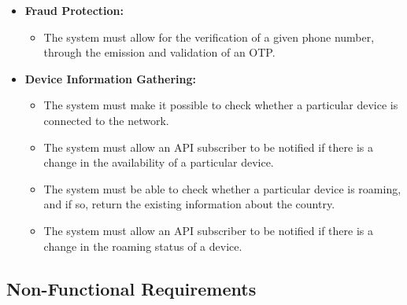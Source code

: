 \begin{itemize}
	\item \textbf{Fraud Protection:}
	      \begin{itemize}
		      \item The system must allow for the verification of a given phone number,
		            through the emission and validation of an OTP.
	      \end{itemize}

	\item \textbf{Device Information Gathering:}
	      \begin{itemize}
		      \item The system must make it possible to check whether a particular
		            device is connected to the network.

		      \item The system must allow an API subscriber to be notified if there is
		            a change in the availability of a particular device.

		      \item The system must be able to check whether a particular device is
		            roaming, and if so, return the existing information about the country.

		      \item The system must allow an API subscriber to be notified if there is
		            a change in the roaming status of a device.
	      \end{itemize}
\end{itemize}

\subsection{Non-Functional Requirements}

